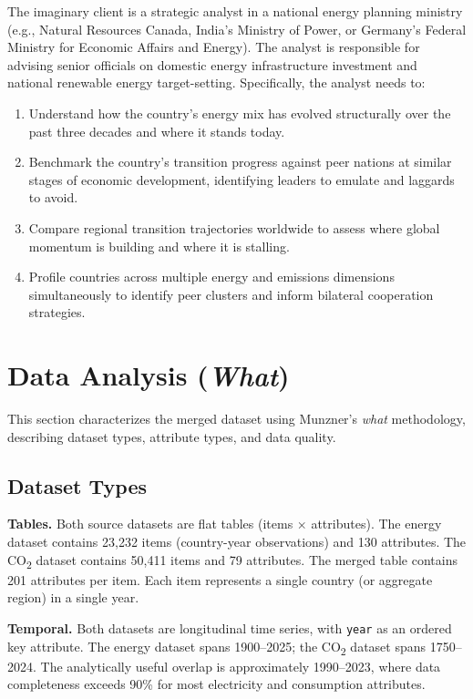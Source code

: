 \documentclass[10pt]{article}
\begin{document}
The imaginary client is a strategic analyst in a national energy planning ministry (e.g., Natural Resources Canada, India's Ministry of Power, or Germany's Federal Ministry for Economic Affairs and Energy). The analyst is responsible for advising senior officials on domestic energy infrastructure investment and national renewable energy target-setting. Specifically, the analyst needs to:
\begin{enumerate}
    \item[(a)] Understand how the country's energy mix has evolved structurally over the past three decades and where it stands today.
    \item[(b)] Benchmark the country's transition progress against peer nations at similar stages of economic development, identifying leaders to emulate and laggards to avoid.
    \item[(c)] Compare regional transition trajectories worldwide to assess where global momentum is building and where it is stalling.
    \item[(d)] Profile countries across multiple energy and emissions dimensions simultaneously to identify peer clusters and inform bilateral cooperation strategies.
\end{enumerate}


\section{Data Analysis (\emph{What})}
\label{sec:what}

This section characterizes the merged dataset using Munzner's \emph{what} methodology, describing dataset types, attribute types, and data quality.

\subsection{Dataset Types}

\textbf{Tables.} Both source datasets are flat tables (items $\times$ attributes). The energy dataset contains 23{,}232 items (country-year observations) and 130 attributes. The CO\textsubscript{2} dataset contains 50{,}411 items and 79 attributes. The merged table contains 201 attributes per item. Each item represents a single country (or aggregate region) in a single year.

\textbf{Temporal.} Both datasets are longitudinal time series, with \texttt{year} as an ordered key attribute. The energy dataset spans 1900--2025; the CO\textsubscript{2} dataset spans 1750--2024. The analytically useful overlap is approximately 1990--2023, where data completeness exceeds 90\% for most electricity and consumption attributes.
\end{document}
